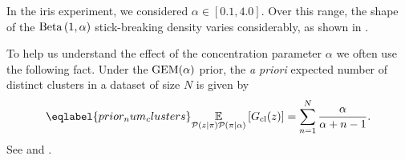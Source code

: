 In the iris experiment, we considered $\alpha\in[0.1, 4.0]$.
Over this range, the shape of
the $\mathrm{Beta}\left(1, \alpha\right)$ stick-breaking density varies considerably, as shown in
.

\BetaPriorsEx

To help us understand the effect of the concentration parameter
$\alpha$ we often use the following fact. Under the $\mathrm{GEM}(\alpha)$ prior, the {\em a priori} expected
number of distinct clusters in a dataset of size $N$ is given by
%
\begin{align}\eqlabel{prior_num_clusters}
\expect{\p(\z \vert \pi)\p(\pi \vert \alpha)}{\nclusters(\z)} =
\sum_{\n = 1}^\N \frac{\alpha}{\alpha + \n - 1}.
\end{align}
%
See \citet{blackwell:1973:polyaurn} and \citet[Equation 11]{Teh:2010:dp}.
